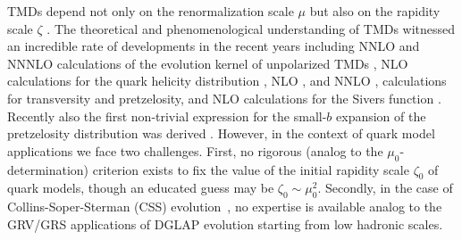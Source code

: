 \documentclass[a4paper]{article}
\begin{document}
\begin{itemize}
TMDs depend not only on the renormalization scale $\mu$ but also on 
the rapidity scale $\zeta$ \cite{Collins:2011zzd}. The theoretical and
phenomenological understanding of TMDs witnessed an incredible rate of 
developments in the recent years including NNLO and NNNLO calculations 
of the evolution kernel of unpolarized TMDs
\cite{Gehrmann:2014yya,Echevarria:2015byo,Echevarria:2015usa,Echevarria:2016scs,Li:2016ctv,Vladimirov:2016dll,Luo:2019hmp,Luo:2019szz,Ebert:2020yqt},
NLO calculations for the quark helicity distribution 
\cite{Gutierrez-Reyes:2017glx}, 
NLO \cite{Gutierrez-Reyes:2017glx}, and NNLO \cite{Gutierrez-Reyes:2018iod},
calculations for transversity and pretzelosity, 
and NLO calculations for the Sivers function 
\cite{Ji:2006ub,Koike:2007dg,Sun:2013hua,Dai:2014ala,Scimemi:2019gge}.
Recently also the first non-trivial expression for the small-$b$
expansion of the pretzelosity distribution was derived \cite{Moos:2020wvd}.
However, in the context of quark model applications we face two challenges.
First, no rigorous (analog to the $\mu_0$-determination) criterion exists 
to fix the value of the initial rapidity scale $\zeta_0$ of quark models, 
though an educated guess may be $\zeta_0\sim\mu_0^2$.
Secondly, in the case of Collins-Soper-Sterman (CSS) evolution~\cite{Collins:1984kg}, 
 no expertise is available analog 
to the GRV/GRS applications of DGLAP evolution starting from low hadronic scales.


\end{itemize}
\end{document}
